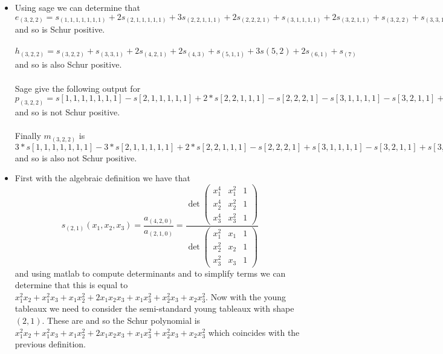 \documentclass[12pt]{amsart}
\theoremstyle{definition}
\begin{document}
\begin{itemize}
\item[(4)] Using sage we can determine that $e_{(3,2,2)}=s_{(1, 1, 1, 1, 1, 1, 1)} + 2s_{(2, 1, 1, 1, 1, 1)} + 3s_{(2, 2, 1, 1, 1)} + 2s_{(2, 2, 2, 1)} + s_{(3, 1, 1, 1, 1)} + 2s_{(3, 2, 1, 1)} + s_{(3, 2, 2)} + s_{(3, 3, 1)}$ and so is Schur positive.\\\\
$h_{(3,2,2)}=s_{(3, 2, 2)} + s_{(3, 3, 1)} + 2s_{(4, 2, 1)} + 2s_{(4, 3)} + s_{(5, 1, 1)} + 3s{(5, 2)} + 2s_{(6, 1)} + s_{(7)}$ and so is also Schur positive.\\\\
Sage give the following output for $p_{(3,2,2)}=s[1, 1, 1, 1, 1, 1, 1] - s[2, 1, 1, 1, 1, 1] + 2*s[2, 2, 1, 1, 1] - s[2, 2, 2, 1] - s[3, 1, 1, 1, 1] - s[3, 2, 1, 1] + s[3, 2, 2] + s[3, 3, 1] + 2*s[4, 1, 1, 1] - s[4, 2, 1] - s[4, 3] - s[5, 1, 1] + 2*s[5, 2] - s[6, 1] + s[7]$ and so is not Schur positive.\\\\
Finally $m_{(3,2,2)}$ is $3*s[1, 1, 1, 1, 1, 1, 1] - 3*s[2, 1, 1, 1, 1, 1] + 2*s[2, 2, 1, 1, 1] - s[2, 2, 2, 1] + s[3, 1, 1, 1, 1] - s[3, 2, 1, 1] + s[3, 2, 2]$ and so is also not Schur positive.\\


\item[(5)] %
First with the algebraic definition we have that $$s_{(2,1)}(x_1,x_2,x_3)=\frac{a_{(4,2,0)}}{a_{(2,1,0)}}=\frac{\det\begin{pmatrix} x_1^4 & x_1^2 & 1\\ x_2^4 & x_2^2 & 1\\ x_3^4 & x_3^2 & 1\end{pmatrix}}{\det\begin{pmatrix} x_1^2 & x_1 & 1\\ x_2^2 & x_2 & 1\\ x_3^2 & x_3 & 1\end{pmatrix}}$$
and using matlab to compute determinants and to simplify terms we can determine that this is equal to $x_1^2x_2 + x_1^2x_3 + x_1x_2^2 + 2x_1x_2x_3 + x_1x_3^2 + x_2^2x_3 + x_2x_3^2$. Now with the young tableaux we need to consider the semi-standard young tableaux with shape $(2,1)$. These are 
\;\;and so the Schur polynomial is $x_1^2x_2 + x_1^2x_3 + x_1x_2^2 + 2x_1x_2x_3 + x_1x_3^2 + x_2^2x_3 + x_2x_3^2$ which coincides with the previous definition.

\end{itemize}
\end{document}
